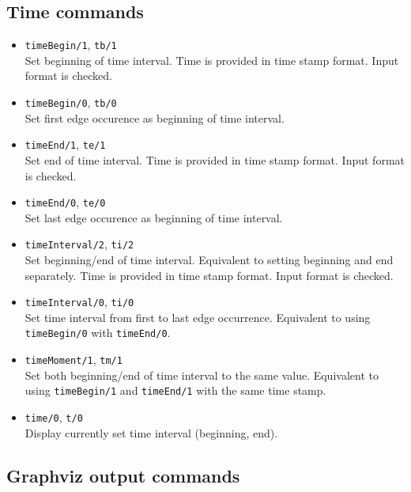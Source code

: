 \documentclass[11pt, a4paper,draft]{article}
\newcommand{\pl}[1]{\texttt{#1}} %
\theoremstyle{plain}
\theoremstyle{definition}
\theoremstyle{remark}
\begin{document}
\subsection{Time commands}

\begin{itemize}
\item \pl{timeBegin/1}, \pl{tb/1} \\
Set beginning of time interval. 
Time is provided in time stamp format. 
Input format is checked.

\item \pl{timeBegin/0}, \pl{tb/0} \\
Set first edge occurence as beginning of time interval.

\item \pl{timeEnd/1}, \pl{te/1} \\
Set end of time interval. 
Time is provided in time stamp format. 
Input format is checked.

\item \pl{timeEnd/0}, \pl{te/0} \\
Set last edge occurence as beginning of time interval.

\item \pl{timeInterval/2}, \pl{ti/2} \\
Set beginning/end of time interval. 
Equivalent to setting beginning and end separately. 
Time is provided in time stamp format. 
Input format is checked.

\item \pl{timeInterval/0}, \pl{ti/0} \\
Set time interval from first to last edge occurrence. 
Equivalent to using \pl{timeBegin/0} with \pl{timeEnd/0}.

\item \pl{timeMoment/1}, \pl{tm/1} \\
Set both beginning/end of time interval to the same value. 
Equivalent to using \pl{timeBegin/1} and \pl{timeEnd/1} with the same time stamp.

\item \pl{time/0}, \pl{t/0} \\
Display currently set time interval (beginning, end).
\end{itemize}

\subsection{Graphviz output commands}
\end{document}
